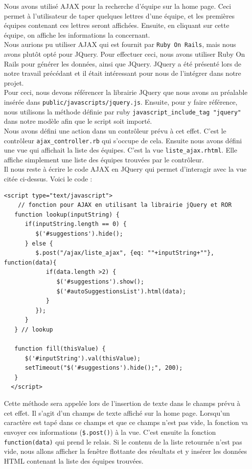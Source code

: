 \documentclass[10pt,a4paper,titlepage]{article}
\begin{document}
Nous avons utilisé AJAX pour la recherche d'équipe sur la home page. Ceci permet à l'utilisateur de taper quelques lettres d'une équipe, et les premières équipes contenant ces lettres seront affichées. Ensuite, en cliquant sur cette équipe, on affiche les informations la concernant. \\

Nous aurions pu utiliser AJAX qui est fournit par \texttt{Ruby On Rails}, mais nous avons plutôt opté pour JQuery. Pour effectuer ceci, nous avons utiliser Ruby On Rails pour générer les données, ainsi que JQuery. JQuery a été présenté lors de notre travail précédant et il était intéressant pour nous de l'intégrer dans notre projet. \\

Pour ceci, nous devons référencer la librairie JQuery que nous avons au préalable insérée dans \texttt{public/javascripts/jquery.js}. Ensuite, pour y faire référence, nous utilisons la méthode définie par ruby \texttt{javascript\_include\_tag "jquery"} dans notre modèle afin que le script soit importé. \\

Nous avons défini une action dans un contrôleur prévu à cet effet. C'est le contrôleur \texttt{ajax\_controller.rb} qui s'occupe de cela. Ensuite nous avons défini une vue qui affichait la liste des équipes. C'est la vue \texttt{liste\_ajax.rhtml}. Elle affiche simplement une liste des équipes trouvées par le contrôleur. \\

Il nous reste à écrire le code AJAX en JQuery qui permet d'interagir avec la vue citée ci-dessus. Voici le code :

\begin{lstlisting}
<script type="text/javascript">
  	// fonction pour AJAX en utilisant la librairie jQuery et ROR
   function lookup(inputString) {
      if(inputString.length == 0) {
         $('#suggestions').hide();
      } else {
         $.post("/ajax/liste_ajax", {eq: ""+inputString+""}, function(data){
            if(data.length >2) {
               $('#suggestions').show();
               $('#autoSuggestionsList').html(data);
            }
         });
      }
   } // lookup
   
   function fill(thisValue) {
      $('#inputString').val(thisValue);
      setTimeout("$('#suggestions').hide();", 200);
   }
  </script>
\end{lstlisting}

Cette méthode sera appelée lors de l'insertion de texte dans le champs prévu à cet effet. Il s'agit d'un champs de texte affiché sur la home page. Lorsqu'un caractère est tapé dans ce champs et que ce champs n'est pas vide, la fonction va envoyer ces informations (\texttt{\$.post()})  à la vue. C'est ensuite la fonction \texttt{function(data)} qui prend le relais. Si le contenu de la liste retournée n'est pas vide, nous allons afficher la fenêtre flottante des résultats et y insérer les données HTML contenant la liste des équipes trouvées.
\end{document}
